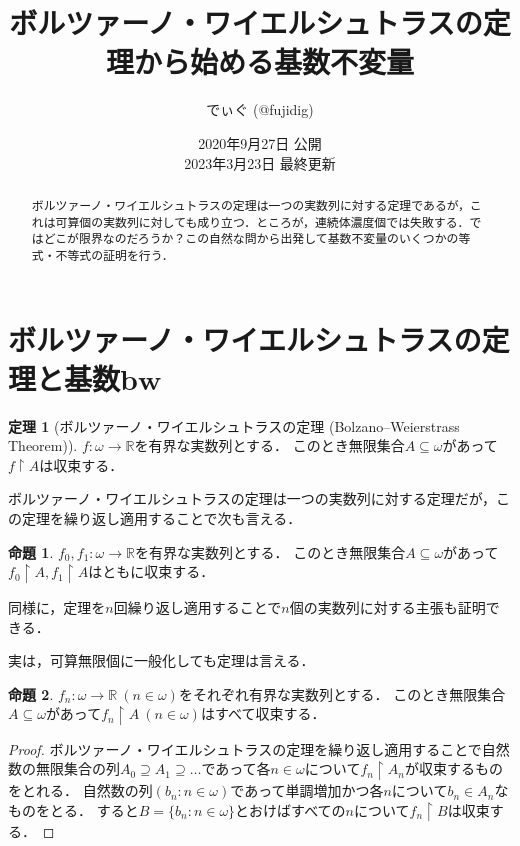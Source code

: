 \documentclass[uplatex,dvipdfmx]{jsarticle}
\title{ボルツァーノ・ワイエルシュトラスの定理から始める基数不変量}
\author{でぃぐ (@fujidig)}
\date{2020年9月27日 公開 \\ 2023年3月23日 最終更新}
\newcommand{\R}{\mathbb{R}}
\renewcommand\subset{\subseteq}
\theoremstyle{definition}
\newtheorem*{thm*}{定理}
\newtheorem*{prop*}{命題}
\theoremstyle{named}
\begin{document}
\maketitle

\begin{abstract}
ボルツァーノ・ワイエルシュトラスの定理は一つの実数列に対する定理であるが，これは可算個の実数列に対しても成り立つ．ところが，連続体濃度個では失敗する．ではどこが限界なのだろうか？この自然な問から出発して基数不変量のいくつかの等式・不等式の証明を行う．
\end{abstract}

\tableofcontents

\section{ボルツァーノ・ワイエルシュトラスの定理と基数$\mathbf{bw}$}

\begin{framed}
\begin{thm*}[ボルツァーノ・ワイエルシュトラスの定理 (Bolzano--Weierstrass Theorem)]
$f: \omega \to \R$を有界な実数列とする．
このとき無限集合$A \subset \omega$があって$f \upharpoonright A$は収束する．
\end{thm*}
\end{framed}

ボルツァーノ・ワイエルシュトラスの定理は一つの実数列に対する定理だが，この定理を繰り返し適用することで次も言える．

\begin{framed}
\begin{prop*}
$f_0, f_1: \omega \to \R$を有界な実数列とする．
このとき無限集合$A \subset \omega$があって$f_0 \upharpoonright A, f_1 \upharpoonright A$はともに収束する．
\end{prop*}
\end{framed}

同様に，定理を$n$回繰り返し適用することで$n$個の実数列に対する主張も証明できる．

実は，可算無限個に一般化しても定理は言える．

\begin{framed}
\begin{prop*}
$f_n: \omega \to \R\ (n \in \omega)$をそれぞれ有界な実数列とする．
このとき無限集合$A \subset \omega$があって$f_n \upharpoonright A \ (n \in \omega)$はすべて収束する．
\end{prop*}
\end{framed}
\begin{proof}
ボルツァーノ・ワイエルシュトラスの定理を繰り返し適用することで自然数の無限集合の列$A_0 \supseteq A_1 \supseteq \dots$であって各$n \in \omega$について$f_n \upharpoonright A_n$が収束するものをとれる．
自然数の列$(b_n : n\in \omega)$であって単調増加かつ各$n$について$b_n \in A_n$なものをとる．
すると$B = \{b_n : n \in \omega\}$とおけばすべての$n$について$f_n \upharpoonright B$は収束する．
\end{proof}
\end{document}
